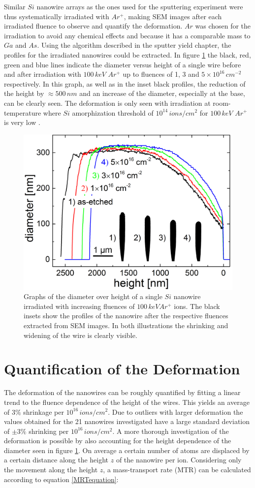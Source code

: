 Similar $Si$ nanowire arrays as the ones used for the sputtering experiment were thus systematically irradiated with $Ar^+$, making SEM images after each irradiated fluence to observe and quantify the deformation. $Ar$ was chosen for the irradiation to avoid any chemical effects and because it has a comparable mass to $Ga$ and $As$. Using the algorithm described in the sputter yield chapter, the profiles for the irradiated nanowires could be extracted. In figure \ref{deformationprofile} the black, red, green and blue lines indicate the diameter versus height of a single wire before and after irradiation with $100\,keV\,\,Ar^+$ up to fluences of 1, 3 and $5 \times 10^{16}\,cm^{-2}$ respectively. In this graph, as well as in the inset black profiles, the reduction of the height by $\approx 500\,nm$ and an increase of the diameter, especially at the base, can be clearly seen. The deformation is only seen with irradiation at room-temperature where $Si$ amorphization threshold of $10^{14}\,ions/cm^2$ for $100\,keV\,\,Ar^+$ is very low \cite{pelaz_ion-beam-induced_2004}.

\begin{figure}
	\centering
		\includegraphics[width=.48\textwidth]{images/deformationprofile.jpg}
	\caption{Graphs of the diameter over height of a single $Si$ nanowire irradiated with increasing fluences of $100\,keV Ar^+$ ions. The black insets show the profiles of the nanowire after the respective fluences extracted from SEM images. In both illustrations the shrinking and widening of the wire is clearly visible.} 
	\label{deformationprofile}
\end{figure}

\section{Quantification of the Deformation}
\label{sec:quantifydeformation}

The deformation of the nanowires can be roughly quantified by fitting a linear trend to the fluence dependence of the height of the wires. This yields an average of $3\%$ shrinkage per $10^{16}\,ions/cm^2$. Due to outliers with larger deformation the values obtained for the 21 nanowires investigated have a large standard deviation of $\pm 3\%$ shrinking per $10^{16}\,ions/cm^2$. A more thorough investigation of the deformation is possible by also accounting for the height dependence of the diameter seen in figure \ref{deformationprofile}. On average a certain number of atoms are displaced by a certain distance along the height $z$ of the nanowire per ion. Considering only the movement along the height $z$, a mass-transport rate (MTR) can be calculated according to equation \ref{MRTequation}:

